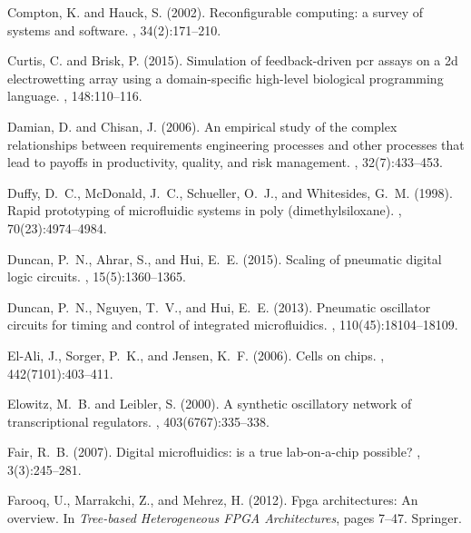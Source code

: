 \documentclass[12pt,letterpaper]{report}          %
\begin{document}
\begin{thebibliography}{}
Compton, K. and Hauck, S. (2002).
\newblock Reconfigurable computing: a survey of systems and software.
, 34(2):171--210.

Curtis, C. and Brisk, P. (2015).
\newblock Simulation of feedback-driven pcr assays on a 2d electrowetting array
  using a domain-specific high-level biological programming language.
, 148:110--116.

Damian, D. and Chisan, J. (2006).
\newblock An empirical study of the complex relationships between requirements
  engineering processes and other processes that lead to payoffs in
  productivity, quality, and risk management.
, 32(7):433--453.

Duffy, D.~C., McDonald, J.~C., Schueller, O.~J., and Whitesides, G.~M. (1998).
\newblock Rapid prototyping of microfluidic systems in poly (dimethylsiloxane).
, 70(23):4974--4984.

Duncan, P.~N., Ahrar, S., and Hui, E.~E. (2015).
\newblock Scaling of pneumatic digital logic circuits.
, 15(5):1360--1365.

Duncan, P.~N., Nguyen, T.~V., and Hui, E.~E. (2013).
\newblock Pneumatic oscillator circuits for timing and control of integrated
  microfluidics.
,
  110(45):18104--18109.

El-Ali, J., Sorger, P.~K., and Jensen, K.~F. (2006).
\newblock Cells on chips.
, 442(7101):403--411.

Elowitz, M.~B. and Leibler, S. (2000).
\newblock A synthetic oscillatory network of transcriptional regulators.
, 403(6767):335--338.

Fair, R.~B. (2007).
\newblock Digital microfluidics: is a true lab-on-a-chip possible?
, 3(3):245--281.

Farooq, U., Marrakchi, Z., and Mehrez, H. (2012).
\newblock Fpga architectures: An overview.
\newblock In {\em Tree-based Heterogeneous FPGA Architectures}, pages 7--47.
  Springer.


\end{thebibliography}
\end{document}

